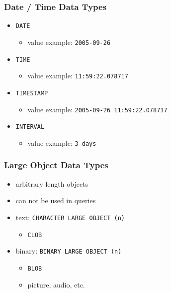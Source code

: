\documentclass[dvipsnames]{beamer}
\theoremstyle{plain}
\begin{document}
\begin{frame}
  \frametitle{Date / Time Data Types}

  \begin{itemize}
    \item \texttt{DATE}
    \begin{itemize}
      \item value example: \texttt{2005-09-26}
    \end{itemize}

    \medskip
    \item \texttt{TIME}
    \begin{itemize}
      \item value example: \texttt{11:59:22.078717}
    \end{itemize}

    \medskip
    \item \texttt{TIMESTAMP}
    \begin{itemize}
      \item value example: \texttt{2005-09-26 11:59:22.078717}
    \end{itemize}

    \medskip
    \item \texttt{INTERVAL}
    \begin{itemize}
      \item value example: \texttt{3 days}
    \end{itemize}
  \end{itemize}
\end{frame}

\begin{frame}
  \frametitle{Large Object Data Types}

  \begin{itemize}
    \item arbitrary length objects
    \item can not be used in queries

    \bigskip
    \item text: \texttt{CHARACTER LARGE OBJECT (n)}
    \begin{itemize}
      \item \texttt{CLOB}
    \end{itemize}

    \item binary: \texttt{BINARY LARGE OBJECT (n)}
    \begin{itemize}
      \item \texttt{BLOB}
      \item picture, audio, etc.
    \end{itemize}
  \end{itemize}
\end{frame}
\end{document}
